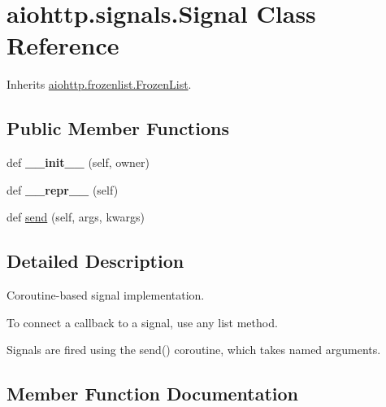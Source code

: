 \hypertarget{classaiohttp_1_1signals_1_1_signal}{}\section{aiohttp.\+signals.\+Signal Class Reference}
\label{classaiohttp_1_1signals_1_1_signal}


Inherits \hyperlink{classaiohttp_1_1frozenlist_1_1_frozen_list}{aiohttp.\+frozenlist.\+Frozen\+List}.

\subsection*{Public Member Functions}
\begin{DoxyCompactItemize}
\item 
\mbox{\label{classaiohttp_1_1signals_1_1_signal_af30b76142f8cb55e82f344a312f9d5f9}} 
def {\bfseries \+\_\+\+\_\+init\+\_\+\+\_\+} (self, owner)
\item 
\mbox{\label{classaiohttp_1_1signals_1_1_signal_a64d7e1383b91cff2a8848d81d4bf1e90}} 
def {\bfseries \+\_\+\+\_\+repr\+\_\+\+\_\+} (self)
\item 
def \hyperlink{classaiohttp_1_1signals_1_1_signal_ac6231f8b2af6c8ab08c1babaa6627038}{send} (self, args, kwargs)
\end{DoxyCompactItemize}


\subsection{Detailed Description}
\begin{DoxyVerb}Coroutine-based signal implementation.

To connect a callback to a signal, use any list method.

Signals are fired using the send() coroutine, which takes named
arguments.
\end{DoxyVerb}
 

\subsection{Member Function Documentation}
\mbox{\label{classaiohttp_1_1signals_1_1_signal_ac6231f8b2af6c8ab08c1babaa6627038}} 
